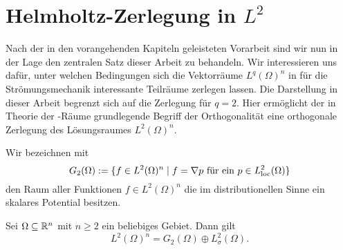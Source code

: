 \chapter{Helmholtz-Zerlegung in $L^2$}

Nach der in den vorangehenden Kapiteln geleisteten Vorarbeit sind wir nun in der Lage den zentralen Satz dieser Arbeit zu behandeln.
Wir interessieren uns dafür, unter welchen Bedingungen sich die Vektorräume $L^q(\Omega)^n$ in für die Strömungsmechanik interessante Teilräume zerlegen lassen.
Die Darstellung in dieser Arbeit begrenzt sich auf die Zerlegung für $q = 2$.
Hier ermöglicht der in Theorie der \hilbert\hyp{}Räume grundlegende Begriff der Orthogonalität eine orthogonale Zerlegung des Lösungsraumes $L^2(\Omega)^n$.

Wir bezeichnen mit 
$$
G_2(\Omega) := \{f \in L^2(\Omega)^n \mid f = \nabla p \text{ für ein } p \in L^2_{\operatorname{loc}}(\Omega)\}
$$
den Raum aller Funktionen $f \in L^2(\Omega)^n$ die im distributionellen Sinne ein skalares Potential besitzen.

\begin{lem}
  Sei $\Omega \subseteq \mathbb{R}^n$ mit $n \geq 2$ ein beliebiges Gebiet.
  Dann gilt
  $$
  L^2(\Omega)^n = G_2(\Omega) \oplus L^2_\sigma(\Omega).
  $$
\end{lem}

